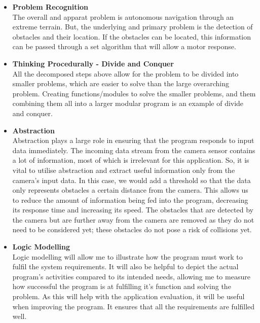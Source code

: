 \documentclass[11pt]{report}
\begin{document}
\begin{itemize}
	\item{\textbf{Problem Recognition}}	
	\\The overall and apparat problem is autonomous navigation through an extreme terrain. But, the underlying 		and primary problem is the detection of obstacles and their location. If the obstacles can be located, 			this information can be passed through a set algorithm that will allow a motor response.
	
	\item{\textbf{Thinking Procedurally - Divide and Conquer}}
	\\All the decomposed steps above allow for the problem to be divided into smaller problems, which are easier 			to solve than the large overarching problem. Creating functions/modules to solve the smaller problems, 			and them combining them all into a larger modular program is an example of divide and conquer. 
	
	\item{\textbf{Abstraction}}
	\\Abstraction plays a large role in ensuring that the program responds to input data immediately. The 			incoming data stream from the camera sensor contains a lot of information, most of which is irrelevant 			for this application. So, it is vital to utilise abstraction and extract useful information only from 			the camera's input data. In this case, we would add a threshold so that the data only represents 			obstacles a certain distance from the camera. This allows us to reduce the amount of information being 			fed into the program, decreasing its response time and increasing its speed. The obstacles that are 		detected by the camera but are further away from the camera are removed as they do not need to be 			considered yet; these obstacles do not pose a risk of collisions yet.   

	\item{\textbf{Logic Modelling}}
	\\Logic modelling will allow me to illustrate how the program must work to fulfil the system requirements. 			It will also be helpful to depict the actual program's activities compared to its intended needs, 			allowing me to measure how successful the program is at fulfilling it's function and solving the 			problem. As this will help with the application evaluation, it will be useful when improving the program. It ensures that all the requirements are fulfilled well. 

\end{itemize}
\end{document}
